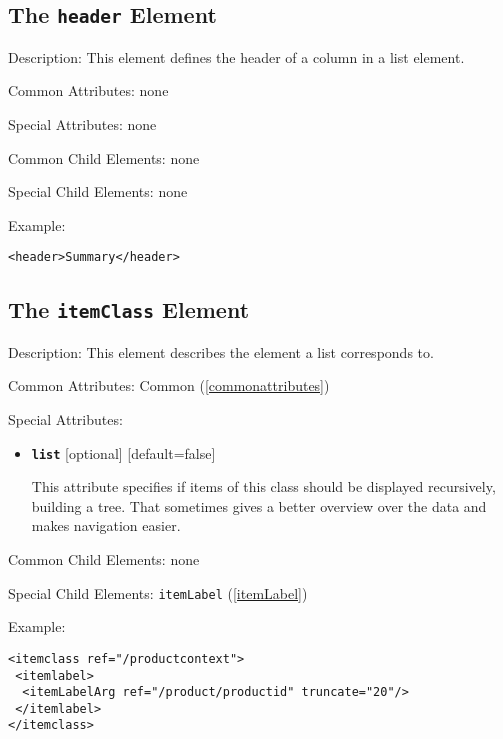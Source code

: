 \subsection{ The \texttt{header} Element}
\label{headerElement}
\begin{description}
 \item Description: This element defines the header of a column in a list element.

 \item Common Attributes: none

 \item Special Attributes: none

 \item Common Child Elements: none

 \item Special Child Elements: none

 \item Example: 

\begin{lstlisting}[caption=\texttt{header} Element]
<header>Summary</header>
\end{lstlisting}
\end{description}





\subsection{ The \texttt{itemClass} Element}
\label{itemClass}
\begin{description}
 \item Description: This element describes the element a list corresponds to.

 \item Common Attributes: Common (\ref{commonattributes})

 \item Special Attributes:
\begin{itemize}
 \item \textbf{\texttt{list}} [optional] [default=false]

This attribute specifies if items of this class should be displayed recursively, building a tree. That sometimes gives a better overview over the data and makes navigation easier.
\end{itemize}

 \item Common Child Elements: none

 \item Special Child Elements: \texttt{itemLabel} (\ref{itemLabel})

 \item Example: 

\begin{lstlisting}[caption=\texttt{itemClass} Element]
<itemclass ref="/productcontext">
 <itemlabel>
  <itemLabelArg ref="/product/productid" truncate="20"/>
 </itemlabel>
</itemclass>
\end{lstlisting}
\end{description}





